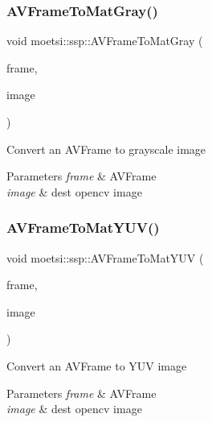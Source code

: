\subsubsection{\texorpdfstring{A\+V\+Frame\+To\+Mat\+Gray()}{AVFrameToMatGray()}}
{\footnotesize\ttfamily void moetsi\+::ssp\+::\+A\+V\+Frame\+To\+Mat\+Gray (\begin{DoxyParamCaption}\item[{A\+V\+Frame\+SharedP \&}]{frame,  }\item[{cv\+::\+Mat \&}]{image }\end{DoxyParamCaption})}

Convert an A\+V\+Frame to grayscale image 
\begin{DoxyParams}{Parameters}
{\em frame} & A\+V\+Frame \\
\hline
{\em image} & dest opencv image \\
\hline
\end{DoxyParams}
\mbox{\label{namespacemoetsi_1_1ssp_a82e9b74b4a9a35255cc5d4ff66dc776f}} 
\subsubsection{\texorpdfstring{A\+V\+Frame\+To\+Mat\+Y\+U\+V()}{AVFrameToMatYUV()}}
{\footnotesize\ttfamily void moetsi\+::ssp\+::\+A\+V\+Frame\+To\+Mat\+Y\+UV (\begin{DoxyParamCaption}\item[{A\+V\+Frame\+SharedP \&}]{frame,  }\item[{cv\+::\+Mat \&}]{image }\end{DoxyParamCaption})}

Convert an A\+V\+Frame to Y\+UV image 
\begin{DoxyParams}{Parameters}
{\em frame} & A\+V\+Frame \\
\hline
{\em image} & dest opencv image \\
\hline
\end{DoxyParams}
\mbox{\label{namespacemoetsi_1_1ssp_a357441ccde272e5d06fb708b62efa5c1}} 

